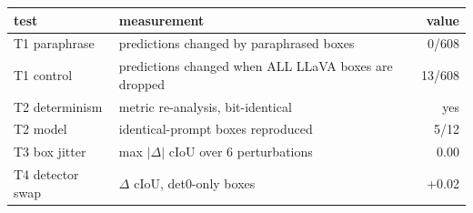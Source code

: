 \begin{tabular}{llr}
\toprule
test & measurement & value \\
\midrule
T1 paraphrase & predictions changed by paraphrased boxes & 0/608 \\
T1 control & predictions changed when ALL LLaVA boxes are dropped & 13/608 \\
T2 determinism & metric re-analysis, bit-identical & yes \\
T2 model & identical-prompt boxes reproduced & 5/12 \\
T3 box jitter & max $|\Delta|$ cIoU over 6 perturbations & 0.00 \\
T4 detector swap & $\Delta$ cIoU, det0-only boxes & +0.02 \\
\bottomrule
\end{tabular}
